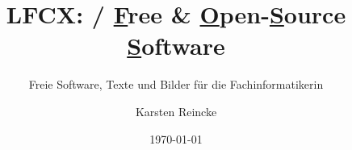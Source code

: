 \documentclass[]{beamer}
\title{LFCX: / 
  \underline{\textbf{F}}ree \& 
  \underline{\textbf{O}}pen-\underline{\textbf{S}}ource \underline{\textbf{S}}oftware}
\subtitle{Freie Software, Texte und Bilder für die Fachinformatikerin}
\institute{GS-LDK}
\author{Karsten Reincke}
\date{\today}
\def\cfgGl{../../../cfg.gl/}
\begin{document}

\begin{frame}
  \titlepage
\end{frame}

%









\logo{}
\newpage



%
\end{document}
